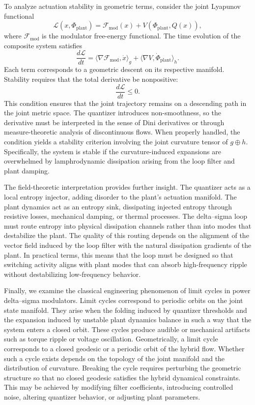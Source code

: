 To analyze actuation stability in geometric terms, consider the joint Lyapunov functional
\[
\mathcal{L}(x, \Phi_{\mathrm{plant}}) = \mathcal{F}_{\mathrm{mod}}(x) + V(\Phi_{\mathrm{plant}}, Q(x)),
\]
where \( \mathcal{F}_{\mathrm{mod}} \) is the modulator free-energy functional. The time evolution of the composite system satisfies
\[
\frac{d\mathcal{L}}{dt} = \langle \nabla \mathcal{F}_{\mathrm{mod}}, \dot{x} \rangle_{g} + \langle \nabla V, \dot{\Phi}_{\mathrm{plant}} \rangle_{h}.
\]
Each term corresponds to a geometric descent on its respective manifold. Stability requires that the total derivative be nonpositive:
\[
\frac{d\mathcal{L}}{dt} \leq 0.
\]
This condition ensures that the joint trajectory remains on a descending path in the joint metric space. The quantizer introduces non-smoothness, so the derivative must be interpreted in the sense of Dini derivatives or through measure-theoretic analysis of discontinuous flows. When properly handled, the condition yields a stability criterion involving the joint curvature tensor of \(g \oplus h\). Specifically, the system is stable if the curvature-induced expansions are overwhelmed by lamphrodynamic dissipation arising from the loop filter and plant damping.

The field-theoretic interpretation provides further insight. The quantizer acts as a local entropy injector, adding disorder to the plant’s actuation manifold. The plant dynamics act as an entropy sink, dissipating injected entropy through resistive losses, mechanical damping, or thermal processes. The delta–sigma loop must route entropy into physical dissipation channels rather than into modes that destabilize the plant. The quality of this routing depends on the alignment of the vector field induced by the loop filter with the natural dissipation gradients of the plant. In practical terms, this means that the loop must be designed so that switching activity aligns with plant modes that can absorb high-frequency ripple without destabilizing low-frequency behavior.

Finally, we examine the classical engineering phenomenon of limit cycles in power delta–sigma modulators. Limit cycles correspond to periodic orbits on the joint state manifold. They arise when the folding induced by quantizer thresholds and the expansion induced by unstable plant dynamics balance in such a way that the system enters a closed orbit. These cycles produce audible or mechanical artifacts such as torque ripple or voltage oscillation. Geometrically, a limit cycle corresponds to a closed geodesic or a periodic orbit of the hybrid flow. Whether such a cycle exists depends on the topology of the joint manifold and the distribution of curvature. Breaking the cycle requires perturbing the geometric structure so that no closed geodesic satisfies the hybrid dynamical constraints. This may be achieved by modifying filter coefficients, introducing controlled noise, altering quantizer behavior, or adjusting plant parameters.

